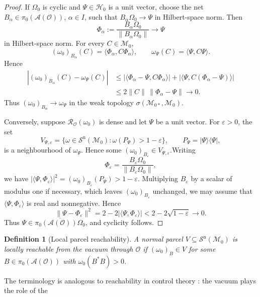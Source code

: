\documentclass[11pt]{article}
\newtheorem{definition}[theorem]{Definition}
\newcommand{\A}{\mathcal{A}}
\newcommand{\Sn}{\mathcal{S}^{\mathrm n}}
\begin{document}
\begin{proof}
If $\Omega_0$ is cyclic and $\Psi\in\mathcal H_0$ is a unit vector,
choose the net $B_\alpha\in\pi_0(\A(\mathcal O))$, $\alpha\in I$, such that
$
B_\alpha\Omega_0\longrightarrow\Psi
$
in Hilbert-space norm. Then
\[
\Phi_\alpha
:=
\frac{B_\alpha\Omega_0}{\|B_\alpha\Omega_0\|}
\longrightarrow\Psi
\]
in Hilbert-space norm. For every $C\in\mathcal M_0$,
\[
(\omega_0)_{B_\alpha}(C)
=
\langle\Phi_\alpha,C\Phi_\alpha\rangle,
\qquad
\omega_\Psi(C)
=
\langle\Psi,C\Psi\rangle.
\]
Hence
\[
\begin{aligned}
\left|
(\omega_0)_{B_\alpha}(C)-\omega_\Psi(C)
\right|
&\leq
\left|
\langle\Phi_\alpha-\Psi,C\Phi_\alpha\rangle
\right|
+
\left|
\langle\Psi,C(\Phi_\alpha-\Psi)\rangle
\right|\\
&\leq
2\|C\|\,\|\Phi_\alpha-\Psi\|
\longrightarrow0.
\end{aligned}
\]
Thus
$
(\omega_0)_{B_\alpha}
\longrightarrow
\omega_\Psi
$
in the weak topology
$\sigma(\mathcal M_{0*},\mathcal M_0)$.


Conversely, suppose $\mathcal R_{\mathcal O}(\omega_0)$ is dense and let
$\Psi$ be a unit vector. For $\varepsilon>0$, the set
\[
V_{\Psi,\varepsilon}
=
\{\omega\in\Sn(\mathcal M_0):
\omega(P_\Psi)>1-\varepsilon\},
\qquad
P_\Psi=|\Psi\rangle\langle\Psi|,
\]
is a neighbourhood of $\omega_\Psi$. Hence some
$(\omega_0)_{B_\varepsilon}\in V_{\Psi,\varepsilon}$.Writing
\[
\Phi_\varepsilon
=
\frac{B_\varepsilon\Omega_0}
{\|B_\varepsilon\Omega_0\|},
\]
we have
$
|\langle\Psi,\Phi_\varepsilon\rangle|^2
=
(\omega_0)_{B_\varepsilon}(P_\Psi)
>
1-\varepsilon.
$
Multiplying $B_\varepsilon$ by a scalar of modulus one if necessary,
which leaves $(\omega_0)_{B_\varepsilon}$ unchanged, we may assume that
$\langle\Psi,\Phi_\varepsilon\rangle$ is real and nonnegative. Hence
\[
\|\Psi-\Phi_\varepsilon\|^2
=
2-2|\langle\Psi,\Phi_\varepsilon\rangle|
<
2-2\sqrt{1-\varepsilon}
\longrightarrow0.
\]
Thus
$\Psi\in\overline{\pi_0(\A(\mathcal O))\Omega_0}$, and cyclicity follows.\end{proof}
\begin{definition}[Local parcel reachability]
\label{def:localreachability}
A normal parcel $V\subseteq\Sn(\mathcal M_0)$ is \emph{locally reachable
from the vacuum through $\mathcal O$} if
$(\omega_0)_B\in V$ for some
$B\in\pi_0(\A(\mathcal O))$ with $\omega_0(B^*B)>0$.
\end{definition}
The terminology is analogous to reachability in control theory
\cite[Ch.~3]{sontag2013mathematical}: the vacuum plays the role of the
\end{document}
